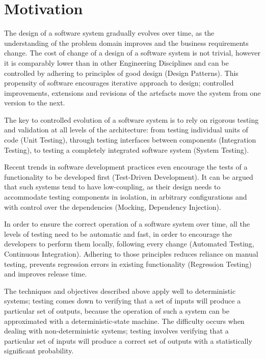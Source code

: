 \section{Motivation}


The design of a software system gradually evolves over time, as the understanding of the problem domain improves and the business requirements change. The cost of change of a design of a software system  is not trivial, however it is comparably lower than in other Engineering Disciplines and can be controlled by adhering to principles of good design (Design Patterns). This propensity of software encourages iterative approach to design; controlled improvements, extensions and revisions of the artefacts move the system from one version to the next. 

The key to controlled evolution of a software system is to rely on rigorous testing and validation at all levels of the architecture: from testing individual units of code (Unit Testing), through testing interfaces between components (Integration Testing), to testing a completely integrated software system (System Testing). 

Recent trends in software development practices even encourage the tests of a functionality to be developed first (Test-Driven Development). It can be argued that such systems tend to have low-coupling, as their design needs to accommodate testing components in isolation, in arbitrary configurations and with control over the dependencies (Mocking, Dependency Injection).

In order to ensure the correct operation of a software system over time, all the levels of testing need to be automatic and fast, in order to encourage the developers to perform them locally, following every change (Automated Testing, Continuous Integration). Adhering to those principles reduces reliance on manual testing, prevents regression errors in existing functionality (Regression Testing) and improves release time.

The techniques and objectives described above apply well to deterministic systems; testing comes down to verifying that a set of inputs will produce a particular set of outputs, because the operation of such a system can be approximated with a deterministic-state machine. The difficulty occurs when dealing with non-deterministic systems; testing involves verifying that a particular set of inputs will produce a correct set of outputs with a statistically significant probability.

